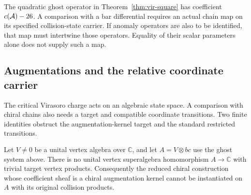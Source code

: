 \begin{remark}
\label{rem:brst-nilpotence-periodicity}
The quadratic ghost operator in Theorem~\ref{thm:vir-square} has coefficient $c(\mathcal{A})-26$.
A comparison with a bar differential requires an actual chain map on its specified collision-state carrier.
If anomaly operators are also to be identified, that map must intertwine those operators.
Equality of their scalar parameters alone does not supply such a map.
\end{remark}

\subsection{Augmentations and the relative coordinate carrier}

The critical Virasoro charge acts on an algebraic state space.
A comparison with chiral chains also needs a target and compatible coordinate transitions.
Two finite identities obstruct the augmentation-kernel target and the standard restricted transitions.

\begin{proposition}\label{prop:vir-no-augmentation}
Let $V\neq0$ be a unital vertex algebra over $\mathbb C$, and let $A=V\otimes bc$ use the ghost system above.
There is no unital vertex superalgebra homomorphism $A\to\mathbb C$ with trivial target vertex products.
Consequently the reduced chiral construction whose coefficient sheaf is a chiral augmentation kernel cannot be instantiated on $A$ with its original collision products.
\end{proposition}

